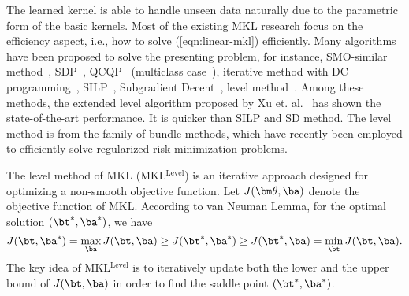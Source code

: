 The learned kernel is able to handle unseen data naturally due to the parametric form of the basic kernels. Most of the existing MKL research focus on the efficiency aspect, i.e., how to solve (\ref{eqn:linear-mkl}) efficiently. Many algorithms have been proposed to solve the presenting problem, for instance, SMO-similar method~\cite{icml/BachLJ04}, SDP~\cite{jmlr/LanckrietCBGJ03}, QCQP~\cite{bioinformatics/LanckrietBCJN04} (multiclass case~\cite{icml/ZienO07}), iterative method with DC programming~\cite{icml/ArgyriouHMP06}, SILP~\cite{nips/SonnenburgRS05,jmlr/SonnenburgRSS06}, Subgradient Decent~\cite{icml/RakotomamonjyBCG07, jmlr/RakotomamonjyBCG08}, level method~\cite{nips/XuJKL08}. Among these methods, the extended level algorithm proposed by Xu et. al.~\cite{nips/XuJKL08} has shown the state-of-the-art performance. It is quicker than SILP and SD method. The level method is from the family of bundle methods, which have recently been employed to efficiently solve regularized risk minimization problems. 

The level method of MKL (MKL$^{\mathrm{Level}}$) is an iterative approach designed for optimizing a non-smooth objective function. Let $J(\bm\theta, \ba)$ denote the objective function of MKL. According to van Neuman Lemma, for the optimal solution $(\bt^*,\ba^*)$, we have
\[
J(\bt, \ba^*) = \max_\ba J(\bt, \ba) \geq J(\bt^*, \ba^*) \geq J(\bt^*, \ba) = \min_\bt J(\bt, \ba).
\]
The key idea of MKL$^{\mathrm{Level}}$ is to iteratively update both the lower and the upper bound of $J(\bt,\ba)$\cite{nips/XuJKL08} in order to find the saddle point $(\bt^*, \ba^*)$.


